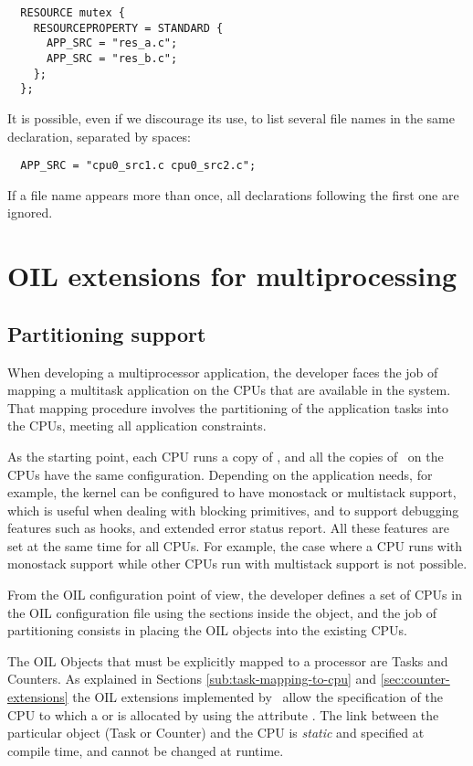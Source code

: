 \begin{lstlisting}
  RESOURCE mutex {
    RESOURCEPROPERTY = STANDARD {
      APP_SRC = "res_a.c";
      APP_SRC = "res_b.c";
    };
  };
\end{lstlisting}

It is possible, even if we discourage its use, to list several file
names in the same declaration, separated by spaces:

\begin{lstlisting}
  APP_SRC = "cpu0_src1.c cpu0_src2.c";
\end{lstlisting}

If a file name appears more than once, all declarations following the
first one are ignored.

\section{OIL extensions for multiprocessing}
\label{sec:oil-multicore}

\subsection{Partitioning support}
When developing a multiprocessor application, the developer faces the
job of mapping a multitask application on the CPUs that are available
in the system.  That mapping procedure involves the partitioning of
the application tasks into the CPUs, meeting all application
constraints.

As the starting point, each CPU runs a copy of \ee, and all the copies 
of \ee\ on the CPUs have the same configuration. Depending on the 
application needs, for example, the kernel can be configured to have 
monostack or multistack support, which is useful when dealing with 
blocking primitives, and to support debugging features such as hooks, 
and extended error status report. All these features are set at the same 
time for all CPUs. For example, the case where a CPU runs with monostack 
support while other CPUs run with multistack support is not possible. 

From the OIL configuration point of view, the developer defines a set
of CPUs in the OIL configuration file using the 
sections inside the  object, and the job of partitioning
consists in placing the OIL objects into the existing CPUs.

The OIL Objects that must be explicitly mapped to a processor are
Tasks and Counters. As explained in Sections
\ref{sub:task-mapping-to-cpu} and \ref{sec:counter-extensions} the OIL
extensions implemented by \rtd\ allow the specification of the CPU to
which a  or  is allocated by using the
attribute . The link between the particular object (Task
or Counter) and the CPU is {\em static} and specified at compile time,
and cannot be changed at runtime.

